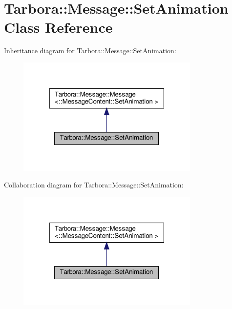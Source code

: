 \hypertarget{classTarbora_1_1Message_1_1SetAnimation}{}\section{Tarbora\+:\+:Message\+:\+:Set\+Animation Class Reference}
\label{classTarbora_1_1Message_1_1SetAnimation}


Inheritance diagram for Tarbora\+:\+:Message\+:\+:Set\+Animation\+:
\nopagebreak
\begin{figure}[H]
\begin{center}
\leavevmode
\includegraphics[width=256pt]{classTarbora_1_1Message_1_1SetAnimation__inherit__graph}
\end{center}
\end{figure}


Collaboration diagram for Tarbora\+:\+:Message\+:\+:Set\+Animation\+:
\nopagebreak
\begin{figure}[H]
\begin{center}
\leavevmode
\includegraphics[width=256pt]{classTarbora_1_1Message_1_1SetAnimation__coll__graph}
\end{center}
\end{figure}

